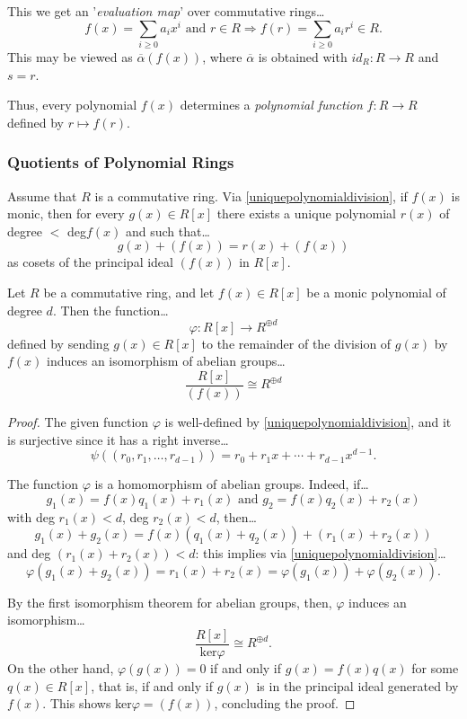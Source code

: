 \noindent This we get an '\emph{evaluation map}' over commutative rings\dots
$$f(x) = \sum_{i \geq 0} a_i x^i \textrm{ and } r \in R \Rightarrow f(r) = \sum_{i \geq 0} a_i r^i \in R.$$
This may be viewed as $\overline{\alpha}(f(x))$, where $\overline{\alpha}$ is obtained with $id_R : R \rightarrow R$ and $s = r$.\newline

\noindent Thus, every polynomial $f(x)$ determines a \emph{polynomial function}\label{polynomialfunction} $f : R \rightarrow R$ defined by $r \mapsto f(r)$.

\subsubsection{Quotients of Polynomial Rings}\label{quotientsofpolynomialrings}
Assume that $R$ is a commutative ring. Via \ref{uniquepolynomialdivision}, if $f(x)$ is monic, then for every $g(x) \in R[x]$ there exists a unique polynomial $r(x)$
of degree $<$ deg$f(x)$ and such that\dots
$$g(x) + (f(x)) = r(x) + (f(x))$$
as cosets of the principal ideal $(f(x))$ in $R[x]$.

\begin{proposition}
Let $R$ be a commutative ring, and let $f(x) \in R[x]$ be a monic polynomial of degree $d$. Then the function\dots
$$\varphi : R[x] \rightarrow R^{\oplus d}$$
defined by sending $g(x) \in R[x]$ to the remainder of the division of $g(x)$ by $f(x)$ induces an isomorphism of abelian
groups\dots
$$\frac{R[x]}{(f(x))} \cong R^{\oplus d}$$
\end{proposition}

\begin{proof}
The given function $\varphi$ is well-defined by \ref{uniquepolynomialdivision}, and it is surjective since it has a right inverse\dots
$$\psi((r_0,r_1,\dots,r_{d-1}))=r_0 + r_1x + \cdots + r_{d-1}x^{d-1}.$$

The function $\varphi$ is a homomorphism of abelian groups. Indeed, if\dots
$$g_1(x) = f(x)q_1(x) + r_1(x) \textrm{ and } g_2 = f(x)q_2(x) + r_2(x)$$
with deg $r_1(x) < d$, deg $r_2(x) < d$, then\dots
$$g_1(x)+g_2(x) = f(x)(q_1(x) + q_2(x)) + (r_1(x) + r_2(x))$$
and deg $(r_1(x) + r_2(x)) < d$: this implies via \ref{uniquepolynomialdivision}\dots
$$\varphi(g_1(x) + g_2(x)) = r_1(x) + r_2(x) = \varphi(g_1(x)) + \varphi(g_2(x)).$$

By the first isomorphism theorem for abelian groups, then, $\varphi$ induces an isomorphism\dots
$$\frac{R[x]}{\textrm{ker}\varphi} \cong R^{\oplus d}.$$
On the other hand, $\varphi(g(x)) = 0$ if and only if $g(x) = f(x)q(x)$ for some $q(x) \in R[x]$,
that is, if and only if $g(x)$ is in the principal ideal generated by $f(x)$. This shows ker$\varphi = (f(x))$,
concluding the proof.
\end{proof}